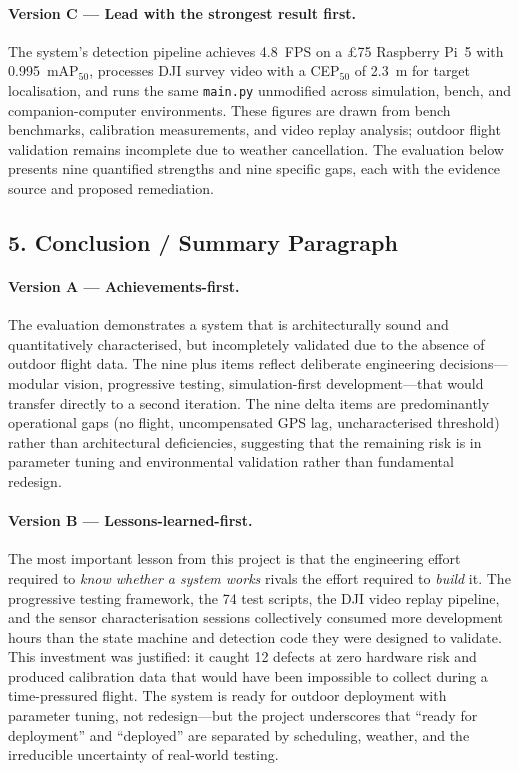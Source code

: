 \paragraph{{\color{olive} Version C --- Lead with the strongest result first.}}
The system's detection pipeline achieves \SI{4.8}{FPS} on a \pounds75 Raspberry Pi~5 with 0.995~mAP$_{50}$, processes DJI survey video with a CEP$_{50}$ of \SI{2.3}{\metre} for target localisation, and runs the same \texttt{main.py} unmodified across simulation, bench, and companion-computer environments. These figures are drawn from bench benchmarks, calibration measurements, and video replay analysis; outdoor flight validation remains incomplete due to weather cancellation. The evaluation below presents nine quantified strengths and nine specific gaps, each with the evidence source and proposed remediation.

\subsection*{5. Conclusion / Summary Paragraph}

\paragraph{{\color{blue} Version A --- Achievements-first.}}
The evaluation demonstrates a system that is architecturally sound and quantitatively characterised, but incompletely validated due to the absence of outdoor flight data. The nine plus items reflect deliberate engineering decisions---modular vision, progressive testing, simulation-first development---that would transfer directly to a second iteration. The nine delta items are predominantly operational gaps (no flight, uncompensated GPS lag, uncharacterised threshold) rather than architectural deficiencies, suggesting that the remaining risk is in parameter tuning and environmental validation rather than fundamental redesign.

\paragraph{{\color{red} Version B --- Lessons-learned-first.}}
The most important lesson from this project is that the engineering effort required to \emph{know whether a system works} rivals the effort required to \emph{build} it. The progressive testing framework, the 74 test scripts, the DJI video replay pipeline, and the sensor characterisation sessions collectively consumed more development hours than the state machine and detection code they were designed to validate. This investment was justified: it caught 12 defects at zero hardware risk and produced calibration data that would have been impossible to collect during a time-pressured flight. The system is ready for outdoor deployment with parameter tuning, not redesign---but the project underscores that ``ready for deployment'' and ``deployed'' are separated by scheduling, weather, and the irreducible uncertainty of real-world testing.


